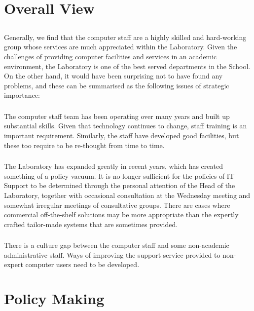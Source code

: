 \documentclass{article}
\begin{document}
\section{Overall View}
\subsection{}
Generally, we find that the computer staff are a highly skilled and hard-working group whose services are much appreciated within the Laboratory. Given the challenges of providing computer facilities and services in an academic environment, the Laboratory is one of the best served departments in the School. On the other hand, it would have been surprising not to have found any problems, and these can be summarised as the following issues of strategic importance:

\subsubsection{}
The computer staff team has been operating over many years and built up substantial skills. Given that technology continues to change, staff training is an important requirement. Similarly, the staff have developed good facilities, but these too require to be re-thought from time to time.

\subsubsection{}
The Laboratory has expanded greatly in recent years, which has created something of a policy vacuum. It is no longer sufficient for the policies of IT Support to be determined through the personal attention of the Head of the Laboratory, together with occasional consultation at the Wednesday meeting and somewhat irregular meetings of consultative groups. There are cases where commercial off-the-shelf solutions may be more appropriate than the expertly crafted tailor-made systems that are sometimes provided.

\subsubsection{}
There is a culture gap between the computer staff and some non-academic administrative staff. Ways of improving the support service provided to non-expert computer users need to be developed.

\section{Policy Making}
\end{document}
